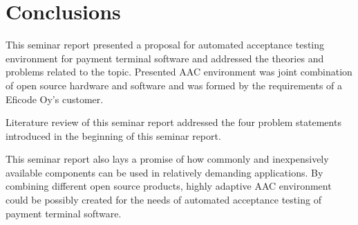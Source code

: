 
\chapter{Conclusions}
\label{chapter:conclusions}

This seminar report presented a proposal for automated acceptance testing environment for payment terminal software and addressed the theories and problems related to the topic. Presented AAC environment was joint combination of open source hardware and software and was formed by the requirements of a Eficode Oy's customer.

Literature review of this seminar report addressed the four problem statements introduced in the beginning of this seminar report.

This seminar report also lays a promise of how commonly and inexpensively available components can be used in relatively demanding applications. By combining different open source products, highly adaptive AAC environment could be possibly created for the needs of automated acceptance testing of payment terminal software.